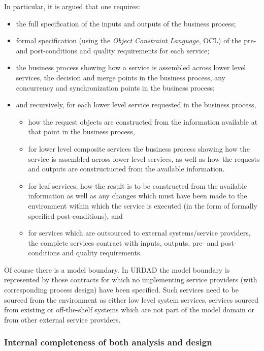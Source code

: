 In particular, it is argued that one requires: 
\begin{itemize}
\item the full specification of the inputs and outputs of the business process;
\item formal specification (using the {\em Object Constraint Language}, OCL) of the pre- and post-conditions and quality requirements for each service;
\item the business process showing how a service is assembled across lower level services, the decision and merge points in the business process, any concurrency and synchronization points in the business process;
\item and recursively, for each lower level service requested in the business process,
	\begin{itemize}
				\item how the request objects are constructed from the information available at that point in the business process,
				\item for lower level composite services the business process showing how the service is assembled across lower level services, as well as how the requests and outputs are constructucted from the available information.
				\item for leaf services, how the result is to be constructed from the available information as well as any changes which must have been made to the environment within which the service is executed (in the form of formally specified post-conditions), and
				\item for services which are outsourced to external systems/service providers, the complete services contract with inputs, outputs, pre- and post-conditions and quality requirements.
	\end{itemize}
\end{itemize}

Of course there is a model boundary. In URDAD the model boundary is represented by those contracts for which no implementing service providers (with corresponding process design) have been specified. Such services need to be sourced from the environment as either low level system services, services sourced from existing or off-the-shelf systems which are not part of the model domain or from other external service providers.


\subsubsection{Internal completeness of both analysis and design}

